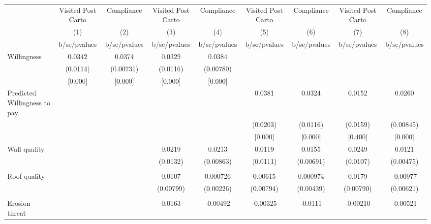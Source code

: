 {
\def\sym#1{\ifmmode^{#1}\else\(^{#1}\)\fi}
\begin{tabular}{l*{8}{c}}
\toprule
                &\multicolumn{1}{c}{Visited Post Carto}&\multicolumn{1}{c}{Compliance}&\multicolumn{1}{c}{Visited Post Carto}&\multicolumn{1}{c}{Compliance}&\multicolumn{1}{c}{Visited Post Carto}&\multicolumn{1}{c}{Compliance}&\multicolumn{1}{c}{Visited Post Carto}&\multicolumn{1}{c}{Compliance}\\
                &\multicolumn{1}{c}{(1)}&\multicolumn{1}{c}{(2)}&\multicolumn{1}{c}{(3)}&\multicolumn{1}{c}{(4)}&\multicolumn{1}{c}{(5)}&\multicolumn{1}{c}{(6)}&\multicolumn{1}{c}{(7)}&\multicolumn{1}{c}{(8)}\\
                &b/se/pvalues&b/se/pvalues&b/se/pvalues&b/se/pvalues&b/se/pvalues&b/se/pvalues&b/se/pvalues&b/se/pvalues\\
\midrule
Willingness     &   0.0342&   0.0374&   0.0329&   0.0384&         &         &         &         \\
                & (0.0114)&(0.00731)& (0.0116)&(0.00780)&         &         &         &         \\
                &  [0.000]&  [0.000]&  [0.000]&  [0.000]&         &         &         &         \\
Predicted Willingness to pay&         &         &         &         &   0.0381&   0.0324&   0.0152&   0.0260\\
                &         &         &         &         & (0.0203)& (0.0116)& (0.0159)&(0.00845)\\
                &         &         &         &         &  [0.000]&  [0.000]&  [0.400]&  [0.000]\\
Wall quality    &         &         &   0.0219&   0.0213&   0.0119&   0.0155&   0.0249&   0.0121\\
                &         &         & (0.0132)&(0.00863)& (0.0111)&(0.00691)& (0.0107)&(0.00475)\\
                &         &         &         &         &         &         &         &         \\
Roof quality    &         &         &   0.0107& 0.000726&  0.00615& 0.000974&   0.0179& -0.00977\\
                &         &         &(0.00799)&(0.00226)&(0.00794)&(0.00439)&(0.00790)&(0.00621)\\
                &         &         &         &         &         &         &         &         \\
Erosion threat  &         &         &   0.0163& -0.00492& -0.00325&  -0.0111& -0.00210& -0.00521\\

\end{tabular}}

